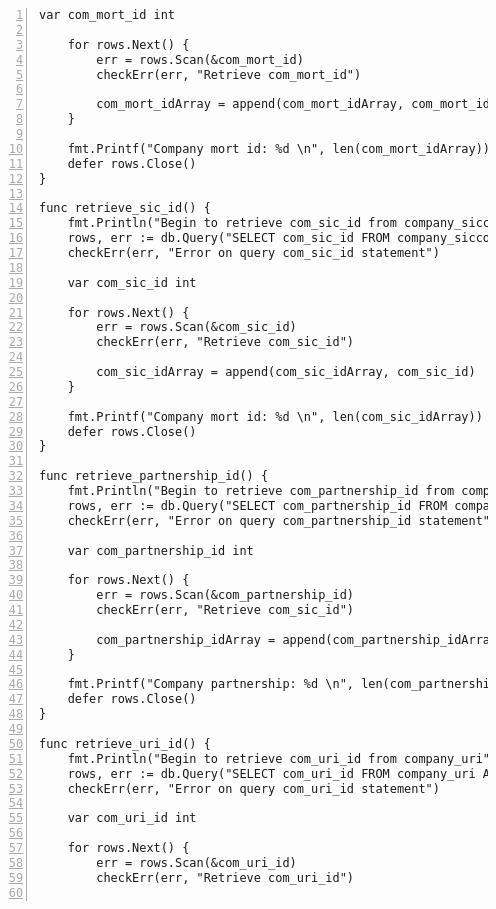 \begin{lstlisting}[breaklines, frame=single, numbers=left, caption={Resource Table Key Retrieval Function.}, label=commandline-02]
	var com_mort_id int 
	
	for rows.Next() {
		err = rows.Scan(&com_mort_id)
		checkErr(err, "Retrieve com_mort_id")
		
		com_mort_idArray = append(com_mort_idArray, com_mort_id) 
	}
	
	fmt.Printf("Company mort id: %d \n", len(com_mort_idArray))
	defer rows.Close()
}

func retrieve_sic_id() {	
	fmt.Println("Begin to retrieve com_sic_id from company_siccodes")
	rows, err := db.Query("SELECT com_sic_id FROM company_siccodes AS sic JOIN company_rawdata AS raw ON sic.com_siccode1 = raw.siccode1 AND sic.com_siccode2 = raw.siccode2 AND raw.siccode3 = sic.com_siccode3 AND raw.siccode4 = sic.com_siccode4;")
	checkErr(err, "Error on query com_sic_id statement")
	
	var com_sic_id int 
	
	for rows.Next() {
		err = rows.Scan(&com_sic_id)
		checkErr(err, "Retrieve com_sic_id")
		
		com_sic_idArray = append(com_sic_idArray, com_sic_id) 
	}
	
	fmt.Printf("Company mort id: %d \n", len(com_sic_idArray))
	defer rows.Close()
}

func retrieve_partnership_id() {	
	fmt.Println("Begin to retrieve com_partnership_id from company_partnership")
	rows, err := db.Query("SELECT com_partnership_id FROM company_partnership AS part JOIN company_rawdata AS raw ON raw.numgenpartners = part.com_num_genpartners AND raw.numlimpartners = part.com_num_limpartners;")
	checkErr(err, "Error on query com_partnership_id statement")
	
	var com_partnership_id int 
	
	for rows.Next() {
		err = rows.Scan(&com_partnership_id)
		checkErr(err, "Retrieve com_sic_id")
		
		com_partnership_idArray = append(com_partnership_idArray, com_partnership_id) 
	}
	
	fmt.Printf("Company partnership: %d \n", len(com_partnership_idArray))
	defer rows.Close()
}

func retrieve_uri_id() {	
	fmt.Println("Begin to retrieve com_uri_id from company_uri")
	rows, err := db.Query("SELECT com_uri_id FROM company_uri AS uri JOIN company_rawdata AS raw ON uri.com_uri = raw.uri;")
	checkErr(err, "Error on query com_uri_id statement")
	
	var com_uri_id int 
	
	for rows.Next() {
		err = rows.Scan(&com_uri_id)
		checkErr(err, "Retrieve com_uri_id")
		

\end{lstlisting}
